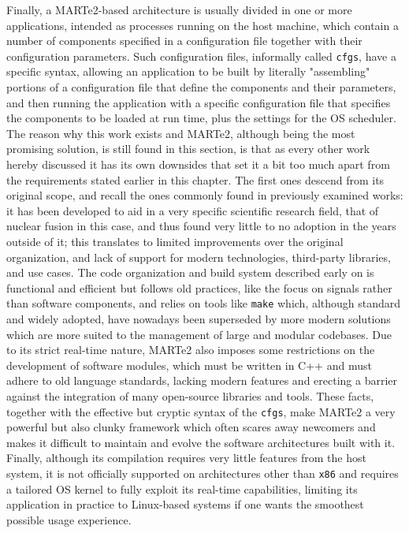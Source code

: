 Finally, a MARTe2-based architecture is usually divided in one or more applications, intended as processes running on the host machine, which contain a number of components specified in a configuration file together with their configuration parameters. Such configuration files, informally called \texttt{cfgs}, have a specific syntax, allowing an application to be built by literally "assembling" portions of a configuration file that define the components and their parameters, and then running the application with a specific configuration file that specifies the components to be loaded at run time, plus the settings for the OS scheduler. The reason why this work exists and MARTe2, although being the most promising solution, is still found in this section, is that as every other work hereby discussed it has its own downsides that set it a bit too much apart from the requirements stated earlier in this chapter. The first ones descend from its original scope, and recall the ones commonly found in previously examined works: it has been developed to aid in a very specific scientific research field, that of nuclear fusion in this case, and thus found very little to no adoption in the years outside of it; this translates to limited improvements over the original organization, and lack of support for modern technologies, third-party libraries, and use cases. The code organization and build system described early on is functional and efficient but follows old practices, like the focus on signals rather than software components, and relies on tools like \texttt{make} which, although standard and widely adopted, have nowadays been superseded by more modern solutions which are more suited to the management of large and modular codebases. Due to its strict real-time nature, MARTe2 also imposes some restrictions on the development of software modules, which must be written in C++ and must adhere to old language standards, lacking modern features and erecting a barrier against the integration of many open-source libraries and tools. These facts, together with the effective but cryptic syntax of the \texttt{cfgs}, make MARTe2 a very powerful but also clunky framework which often scares away newcomers and makes it difficult to maintain and evolve the software architectures built with it. Finally, although its compilation requires very little features from the host system, it is not officially supported on architectures other than \texttt{x86} and requires a tailored OS kernel to fully exploit its real-time capabilities, limiting its application in practice to Linux-based systems if one wants the smoothest possible usage experience.

